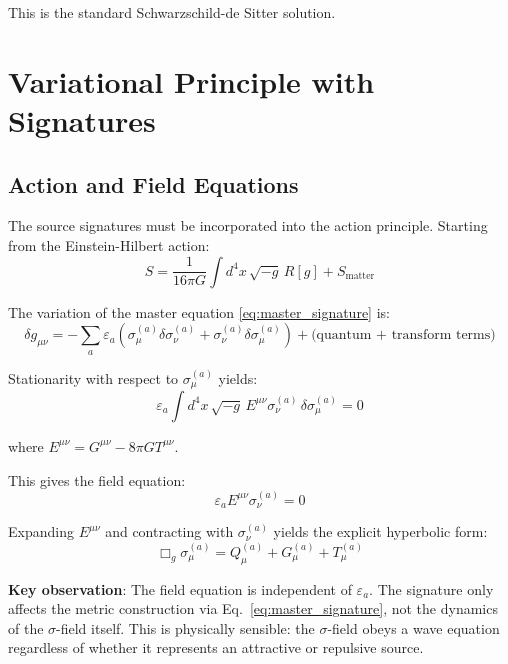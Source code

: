 \documentclass[11pt,a4paper]{article}
\theoremstyle{definition}
\theoremstyle{remark}
\begin{document}
	This is the standard Schwarzschild-de Sitter solution.
	
	\section{Variational Principle with Signatures}
	
	\subsection{Action and Field Equations}
	
	The source signatures must be incorporated into the action principle. Starting from the Einstein-Hilbert action:
	\begin{equation}
		S = \frac{1}{16\pi G}\int d^4x\, \sqrt{-g}\, R[g] + S_{\text{matter}}
	\end{equation}
	
	The variation of the master equation \eqref{eq:master_signature} is:
	\begin{equation}
		\delta g_{\mu\nu} = -\sum_a \varepsilon_a\left(\sigma_\mu^{(a)}\delta\sigma_\nu^{(a)} + \sigma_\nu^{(a)}\delta\sigma_\mu^{(a)}\right) + \text{(quantum + transform terms)}
		\label{eq:variation_signature}
	\end{equation}
	
	Stationarity with respect to $\sigma_\mu^{(a)}$ yields:
	\begin{equation}
		\varepsilon_a \int d^4x\, \sqrt{-g}\, E^{\mu\nu}\sigma_\nu^{(a)}\, \delta\sigma_\mu^{(a)} = 0
	\end{equation}
	
	where $E^{\mu\nu} = G^{\mu\nu} - 8\pi GT^{\mu\nu}$.
	
	This gives the field equation:
	\begin{equation}
		\varepsilon_a E^{\mu\nu}\sigma_\nu^{(a)} = 0
		\label{eq:field_eq_implicit}
	\end{equation}
	
	Expanding $E^{\mu\nu}$ and contracting with $\sigma_\nu^{(a)}$ yields the explicit hyperbolic form:
	\begin{equation}
		\boxed{\Box_g\sigma_\mu^{(a)} = Q_\mu^{(a)} + G_\mu^{(a)} + T_\mu^{(a)}}
		\label{eq:field_eq_signature}
	\end{equation}
	
	\textbf{Key observation}: The field equation is independent of $\varepsilon_a$. The signature only affects the metric construction via Eq.~\eqref{eq:master_signature}, not the dynamics of the $\sigma$-field itself. This is physically sensible: the $\sigma$-field obeys a wave equation regardless of whether it represents an attractive or repulsive source.
	
\end{document}
